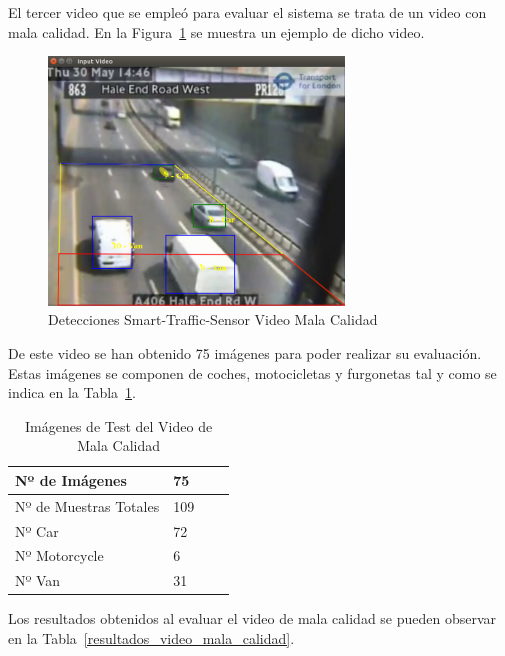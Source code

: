 El tercer video que se empleó para evaluar el sistema se trata de un video con mala calidad. En la Figura~\ref{fig.video_mala_calidad} se muestra un ejemplo de dicho video.


\begin{figure}
\begin{center}
	\includegraphics[width=0.7\textwidth]{figures/Experimentos/sts_mala_calidad.png}
   \caption{Detecciones Smart-Traffic-Sensor Video Mala Calidad}
	\label{fig.video_mala_calidad}
\end{center}
\end{figure}

De este video se han obtenido 75 imágenes para poder realizar su evaluación. Estas imágenes se componen de coches, motocicletas y furgonetas tal y como se indica en la Tabla~\ref{tabla_video_mala_calidad}. 

\begin{table}[htbp]
\begin{center}
\begin{tabular}{|l|l|l|l|}
\hline
Nº de Imágenes  & 75 \\
\hline \hline
Nº de Muestras Totales & 109\\ \hline
Nº Car & 72 \\ \hline
Nº Motorcycle & 6 \\ \hline
Nº Van & 31 \\ \hline
\end{tabular}
\caption{Imágenes de Test del Video de Mala Calidad}
\label{tabla_video_mala_calidad}
\end{center}
\end{table}

Los resultados obtenidos al evaluar el video de mala calidad se pueden observar en la Tabla~\ref{resultados_video_mala_calidad}.

